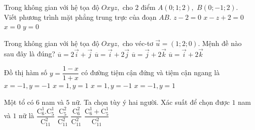 \begin{ex}%
Trong không gian với hệ tọa độ $ Oxyz, $ cho $ 2 $ điểm $ A(0;1;2), $ $ B(0;-1;2).$ Viết phương trình mặt phẳng trung trực của
đoạn $ AB. $
\choice
{$ z-2=0 $}
{$ x-z+2=0 $}
{$ x=0 $}
{\True $ y=0 $}
\end{ex}
\begin{ex}%
Trong không gian với hệ tọa độ $ Oxyz, $ cho véc-tơ $ \overrightarrow{u}=(1;2;0). $ Mệnh đề nào sau đây là đúng?
\choice
{$ \overline{u}=2\overrightarrow{i}+\overrightarrow{j} $}
{\True $ \overline{u}=\overrightarrow{i}+2\overrightarrow{j} $}
{$ \overline{u}=\overrightarrow{j}+2\overrightarrow{k} $}
{$ \overline{u}=\overrightarrow{i}+2\overrightarrow{k} $}
\end{ex}
\begin{ex}%
Đồ thị hàm số $ y=\dfrac{1-x}{1+x} $ có đường tiệm cận đứng và tiệm cận ngang là
\choice
{\True $ x=-1, y=-1 $}
{$ x=1, y=1 $}
{$ x=1, y=-1 $}
{$ x=-1, y=1 $}
\end{ex}
\begin{ex}%
Một tổ có $ 6 $ nam và $ 5 $ nữ. Ta chọn tùy ý hai người. Xác suất để chọn được $ 1 $ nam và $ 1 $ nữ là
\choice
{\True $ \dfrac{\mathrm{C}_6^1. \mathrm{C}_5^1}{\mathrm{C}^2_{11}} $}
{$ \dfrac{\mathrm{C}_5^2}{\mathrm{C}_{11}^2} $}
{$ \dfrac{\mathrm{C}_6^2}{\mathrm{C}_{11}^2} $}
{$ \dfrac{\mathrm{C}_6^1+ \mathrm{C}_5^1}{\mathrm{C}^2_{11}} $}
\end{ex}
